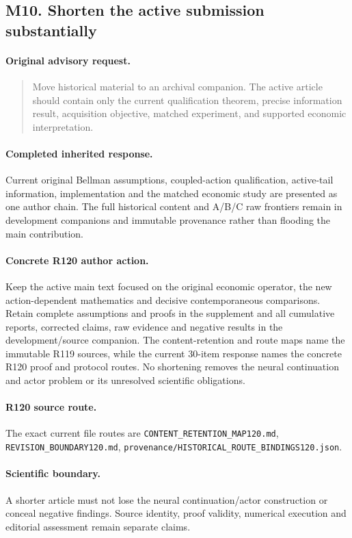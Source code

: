 \subsection{M10. Shorten the active submission substantially}
\label{response120:M10}
\paragraph{Original advisory request.}
\begin{quote}
Move historical material to an archival companion. The active article should contain only the current qualification theorem, precise information result, acquisition objective, matched experiment, and supported economic interpretation.
\end{quote}
\paragraph{Completed inherited response.}
Current original Bellman assumptions, coupled-action qualification, active-tail information, implementation and the matched economic study are presented as one author chain. The full historical content and A/B/C raw frontiers remain in development companions and immutable provenance rather than flooding the main contribution.
\paragraph{Concrete R120 author action.}
Keep the active main text focused on the original economic operator, the new action-dependent mathematics and decisive contemporaneous comparisons. Retain complete assumptions and proofs in the supplement and all cumulative reports, corrected claims, raw evidence and negative results in the development/source companion. The content-retention and route maps name the immutable R119 sources, while the current 30-item response names the concrete R120 proof and protocol routes. No shortening removes the neural continuation and actor problem or its unresolved scientific obligations.
\paragraph{R120 source route.}
The exact current file routes are \nolinkurl{CONTENT_RETENTION_MAP120.md}, \nolinkurl{REVISION_BOUNDARY120.md}, \nolinkurl{provenance/HISTORICAL_ROUTE_BINDINGS120.json}.
\paragraph{Scientific boundary.}
A shorter article must not lose the neural continuation/actor construction or conceal negative findings. Source identity, proof validity, numerical execution and editorial assessment remain separate claims.

